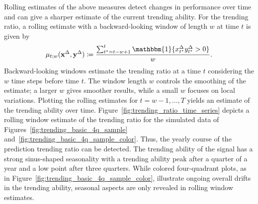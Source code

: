 \documentclass[pdflatex]{sn-jnl}
\theoremstyle{plain}%
\theoremstyle{definition}
\newcommand{\ind}[1]{\mathbbm{1}\{#1\}}
\newcommand{\diffx}{\mathbf{x}^{\Delta}}
\newcommand{\diffy}{\mathbf{y}^{\Delta}}
\newcommand{\diffxt}[1][t]{x^{\Delta}_{#1}}
\newcommand{\diffyt}[1][t]{y^{\Delta}_{#1}}
\newcommand{\acc}{\mu}
\begin{document}
Rolling estimates of the above measures detect changes in performance over time and can give a sharper estimate of the current trending ability.
For the trending ratio, a rolling estimate with a backward-looking window of length $w$ at time $t$ is given by
\begin{equation*}
    \acc_{t; w} (\diffx, \diffy) \coloneqq \frac{\sum_{t^\star = t-w + 1}^{t} \ind{\diffxt[t^\star] \diffyt[t^\star] > 0}}{w}.\label{eq:acc_rolling}
\end{equation*}
Backward-looking windows estimate the trending ratio at a time $t$ considering the $w$ time steps before time $t$.
The window length $w$ controls the smoothing of the estimate; a larger $w$ gives smoother results, while a small $w$ focuses on local variations.
Plotting the rolling estimates for $t = w-1, \dots, T$ yields an estimate of the trending ability over time.
Figure~\ref{fig:trending_ratio_time_series} depicts a rolling window estimate of the trending ratio for the simulated data of Figures~\ref{fig:trending_basic_4q_sample} and~\ref{fig:trending_basic_4q_sample_color}.
Thus, the yearly course of the prediction trending ratio can be detected.
The trending ability of the signal has a strong sinus-shaped seasonality with a trending ability peak after a quarter of a year and a low point after three quarters.
While colored four-quadrant plots, as in Figure~\ref{fig:trending_basic_4q_sample_color}, illustrate ongoing overall drifts in the trending ability, seasonal aspects are only revealed in rolling window estimates.
\end{document}
